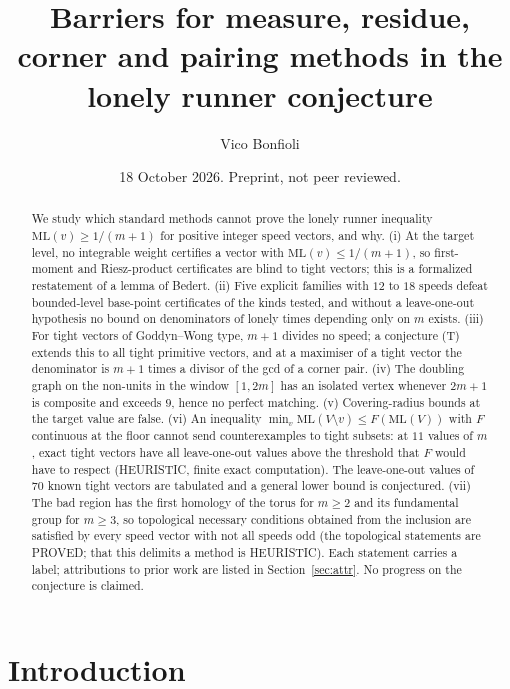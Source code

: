 \documentclass[11pt]{article}
\title{Barriers for measure, residue, corner and pairing methods in the lonely runner conjecture}
\author{Vico Bonfioli}
\date{18 October 2026. Preprint, not peer reviewed.}
\theoremstyle{remark}
\newcommand{\ML}{\mathrm{ML}}
\begin{document}
\maketitle

\begin{abstract}
We study which standard methods cannot prove the lonely runner inequality $\ML(v)\ge 1/(m+1)$ for positive integer speed vectors, and why. (i) At the target level, no integrable weight certifies a vector with $\ML(v)\le1/(m+1)$, so first-moment and Riesz-product certificates are blind to tight vectors; this is a formalized restatement of a lemma of Bedert. (ii) Five explicit families with $12$ to $18$ speeds defeat bounded-level base-point certificates of the kinds tested, and without a leave-one-out hypothesis no bound on denominators of lonely times depending only on $m$ exists. (iii) For tight vectors of Goddyn--Wong type, $m+1$ divides no speed; a conjecture (T) extends this to all tight primitive vectors, and at a maximiser of a tight vector the denominator is $m+1$ times a divisor of the gcd of a corner pair. (iv) The doubling graph on the non-units in the window $[1,2m]$ has an isolated vertex whenever $2m+1$ is composite and exceeds $9$, hence no perfect matching. (v) Covering-radius bounds at the target value are false. (vi) An inequality $\min_v\ML(V\setminus v)\le F(\ML(V))$ with $F$ continuous at the floor cannot send counterexamples to tight subsets: at $11$ values of $m$, exact tight vectors have all leave-one-out values above the threshold that $F$ would have to respect (HEURISTIC, finite exact computation). The leave-one-out values of $70$ known tight vectors are tabulated and a general lower bound is conjectured. (vii) The bad region has the first homology of the torus for $m\ge2$ and its fundamental group for $m\ge3$, so topological necessary conditions obtained from the inclusion are satisfied by every speed vector with not all speeds odd (the topological statements are PROVED; that this delimits a method is HEURISTIC). Each statement carries a label; attributions to prior work are listed in Section~\ref{sec:attr}. No progress on the conjecture is claimed.
\end{abstract}

\section{Introduction}\label{sec:intro}
\end{document}
